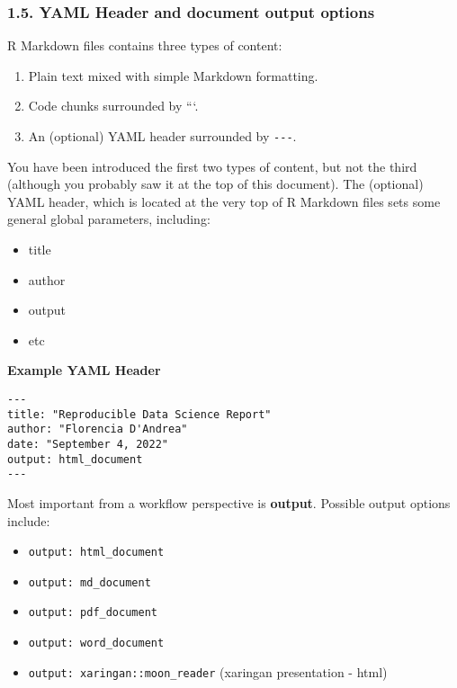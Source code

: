 \documentclass[
]{article}
\providecommand{\tightlist}{%
  \setlength{\itemsep}{0pt}\setlength{\parskip}{0pt}}
\begin{document}
\hypertarget{yaml-header-and-document-output-options}{%
\subsubsection{1.5. YAML Header and document output
options}\label{yaml-header-and-document-output-options}}

R Markdown files contains three types of content:

\begin{enumerate}
\def\labelenumi{\arabic{enumi}.}
\tightlist
\item
  Plain text mixed with simple Markdown formatting.
\item
  Code chunks surrounded by ```.
\item
  An (optional) YAML header surrounded by \texttt{-\/-\/-}.
\end{enumerate}

You have been introduced the first two types of content, but not the
third (although you probably saw it at the top of this document). The
(optional) YAML header, which is located at the very top of R Markdown
files sets some general global parameters, including:

\begin{itemize}
\tightlist
\item
  title
\item
  author
\item
  output
\item
  etc
\end{itemize}

\textbf{Example YAML Header}

\begin{verbatim}
---
title: "Reproducible Data Science Report"
author: "Florencia D'Andrea"
date: "September 4, 2022"
output: html_document
---
\end{verbatim}

Most important from a workflow perspective is \textbf{output}. Possible
output options include:

\begin{itemize}
\tightlist
\item
  \texttt{output:\ html\_document}
\item
  \texttt{output:\ md\_document}
\item
  \texttt{output:\ pdf\_document}
\item
  \texttt{output:\ word\_document}
\item
  \texttt{output:\ xaringan::moon\_reader} (xaringan presentation -
  html)
\end{itemize}
\end{document}
